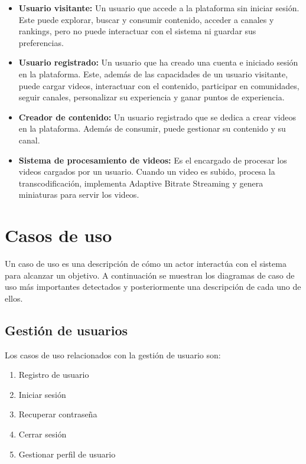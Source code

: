\begin{itemize}
    \item \textbf{Usuario visitante: } Un usuario que accede a la plataforma sin iniciar sesión. Este puede explorar, buscar y consumir contenido, acceder a canales y rankings, pero no puede interactuar con el sistema ni guardar sus preferencias.
    \item \textbf{Usuario registrado: } Un usuario que ha creado una cuenta e iniciado sesión en la plataforma. Este, además de las capacidades de un usuario visitante, puede cargar videos, interactuar con el contenido, participar en comunidades, seguir canales, personalizar su experiencia y ganar puntos de experiencia.
    \item \textbf{Creador de contenido: } Un usuario registrado que se dedica a crear videos en la plataforma. Además de consumir, puede gestionar su contenido y su canal.
    \item \textbf{Sistema de procesamiento de videos: } Es el encargado de procesar los videos cargados por un usuario. Cuando un video es subido, procesa la transcodificación, implementa Adaptive Bitrate Streaming y genera miniaturas para servir los videos.
\end{itemize}

\section{Casos de uso}

Un caso de uso es una descripción de cómo un actor interactúa con el sistema para alcanzar un objetivo. A continuación se muestran los diagramas de caso de uso más importantes detectados y posteriormente una descripción de cada uno de ellos.

\subsection{Gestión de usuarios}

Los casos de uso relacionados con la gestión de usuario son:

\begin{enumerate}
    \item Registro de usuario
    \item Iniciar sesión
    \item Recuperar contraseña
    \item Cerrar sesión 
    \item Gestionar perfil de usuario
\end{enumerate}

